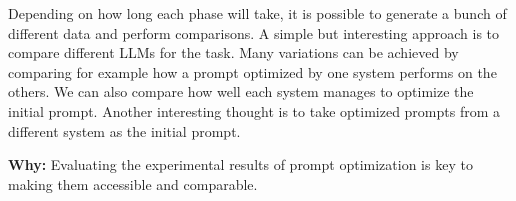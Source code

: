 Depending on how long each phase will take, it is possible to generate a bunch of different data and perform comparisons.
A simple but interesting approach is to compare different LLMs for the task. Many variations can be achieved by comparing for example how a prompt optimized by one system performs on the others. We can also compare how well each system manages to optimize the initial prompt. 
Another interesting thought is to take optimized prompts from a different system as the initial prompt. 


\textbf{Why:} Evaluating the experimental results of prompt optimization is key to making them accessible and comparable. 